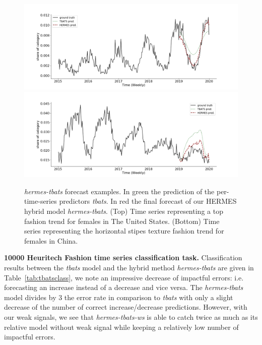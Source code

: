 \documentclass[lettersize,journal]{IEEEtran}
\begin{document}
\begin{figure}
\centering
  \includegraphics[width=1.\linewidth]{figure/us_female_top}
  \includegraphics[width=1.\linewidth]{figure/cn_female_texture_horizontalstripe}
\caption{\textit{hermes-tbats} forecast examples. In green the prediction of the per-time-series predictors \textit{tbats}. In red the final forecast of our HERMES hybrid model \textit{hermes-tbats}. (Top) Time series representing a top fashion trend for females in The United States. (Bottom) Time series representing the horizontal stipes texture fashion trend for females in China.}
\label{fig:examples}
\end{figure}

\textbf{10000 Heuritech Fashion time series classification task. } Classification results between the \textit{tbats} model and the hybrid method \textit{hermes-tbats} are given in Table~\ref{tab:tbatsclass}, we note an impressive decrease of impactful errors: i.e. forecasting an increase instead of a decrease and vice versa. The \textit{hermes-tbats} model divides by 3 the error rate in comparison to \textit{tbats} with only a slight decrease of the number of correct increase/decrease predictions. However, with our weak signals, we see that \textit{hermes-tbats-ws} is able to catch twice as much as its relative model without weak signal while keeping a relatively low number of impactful errors.
\end{document}
